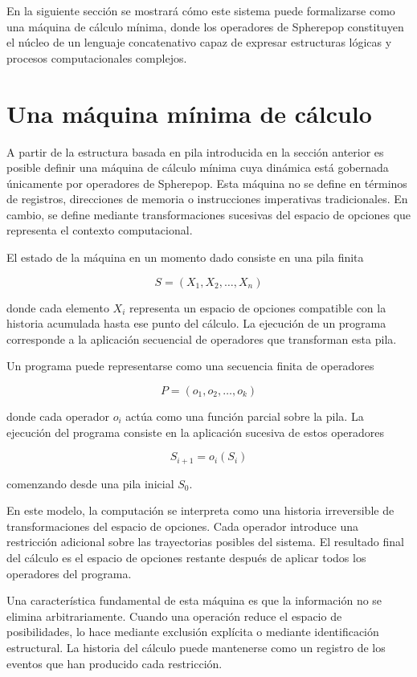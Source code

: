 \documentclass[12pt]{article}
\begin{document}
En la siguiente sección se mostrará cómo este sistema puede formalizarse como una máquina de cálculo mínima, donde los operadores de Spherepop constituyen el núcleo de un lenguaje concatenativo capaz de expresar estructuras lógicas y procesos computacionales complejos.

\section{Una máquina mínima de cálculo}

A partir de la estructura basada en pila introducida en la sección anterior es posible definir una máquina de cálculo mínima cuya dinámica está gobernada únicamente por operadores de Spherepop. Esta máquina no se define en términos de registros, direcciones de memoria o instrucciones imperativas tradicionales. En cambio, se define mediante transformaciones sucesivas del espacio de opciones que representa el contexto computacional.

El estado de la máquina en un momento dado consiste en una pila finita

\[
S = (X_1, X_2, \ldots, X_n)
\]

donde cada elemento \(X_i\) representa un espacio de opciones compatible con la historia acumulada hasta ese punto del cálculo. La ejecución de un programa corresponde a la aplicación secuencial de operadores que transforman esta pila.

Un programa puede representarse como una secuencia finita de operadores

\[
P = (o_1, o_2, \ldots, o_k)
\]

donde cada operador \(o_i\) actúa como una función parcial sobre la pila. La ejecución del programa consiste en la aplicación sucesiva de estos operadores

\[
S_{i+1} = o_i(S_i)
\]

comenzando desde una pila inicial \(S_0\).

En este modelo, la computación se interpreta como una historia irreversible de transformaciones del espacio de opciones. Cada operador introduce una restricción adicional sobre las trayectorias posibles del sistema. El resultado final del cálculo es el espacio de opciones restante después de aplicar todos los operadores del programa.

Una característica fundamental de esta máquina es que la información no se elimina arbitrariamente. Cuando una operación reduce el espacio de posibilidades, lo hace mediante exclusión explícita o mediante identificación estructural. La historia del cálculo puede mantenerse como un registro de los eventos que han producido cada restricción.
\end{document}
